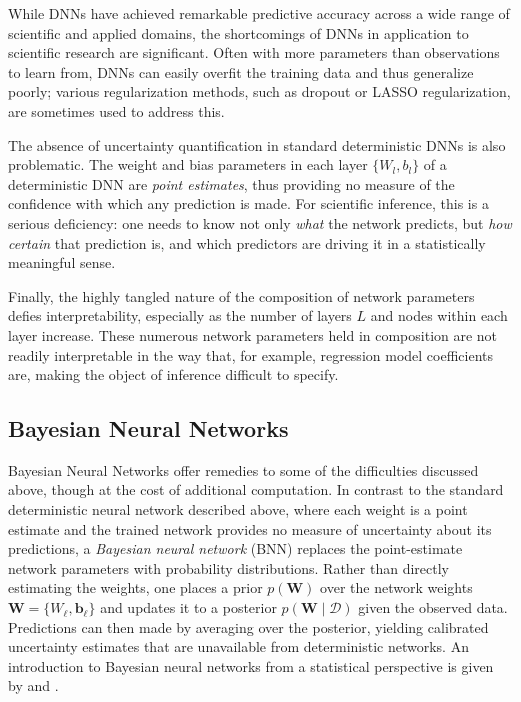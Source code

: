 While DNNs have achieved remarkable predictive accuracy across
a wide range of scientific and applied domains, the shortcomings of DNNs in application to scientific research are significant.  Often with more parameters than observations to learn from, DNNs can easily overfit the training data and 
thus generalize poorly; various regularization methods, such as dropout or LASSO regularization, are sometimes used to address this.

The absence of uncertainty quantification in standard deterministic DNNs is also problematic.  The weight and bias parameters in each layer $\{W_l, b_l\}$ of a deterministic DNN are \textit{point estimates}, thus providing no measure of the confidence with which any prediction is made.  For scientific inference, this is a serious
deficiency: one needs to know not only \emph{what} the network predicts,
but \emph{how certain} that prediction is, and which predictors are
driving it in a statistically meaningful sense.

Finally, the highly tangled nature of the composition of network parameters defies interpretability, especially as the number of layers $L$ and nodes within each layer increase.  These numerous network parameters held in composition are not readily interpretable 
in the way that, for example, regression model coefficients are, making 
the object of inference difficult to specify.



\subsection{Bayesian Neural Networks}
\label{subsec:bnn}

Bayesian Neural Networks offer remedies to some of the difficulties discussed above, though at the cost of additional computation.  In contrast to the standard deterministic neural network described above, where each weight is a point
estimate and the trained network provides no measure of
uncertainty about its predictions, a \emph{Bayesian neural network} (BNN) replaces the point-estimate
network parameters with probability distributions. Rather than
directly estimating the weights, one places a prior
$p(\mathbf{W})$ over the network weights
$\mathbf{W} = \{W_\ell, \mathbf{b}_\ell\}$ and updates it to a
posterior $p(\mathbf{W} \mid \mathcal{D})$ given the observed data.
Predictions can then made by averaging over the posterior, yielding
calibrated uncertainty estimates that are unavailable from
deterministic networks. An introduction to Bayesian neural
networks from a statistical perspective is given by \citet{jospin_hands-bayesian_2022} and \citet{arbel_primer_2023}.

